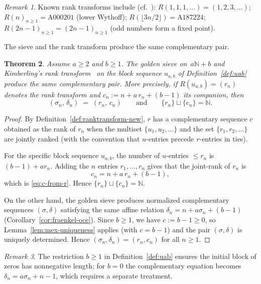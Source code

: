 \documentclass[11pt]{article}
\numberwithin{equation}{section}
\theoremstyle{plain}
\newtheorem{theorem}{Theorem}[section]
\theoremstyle{definition}
\theoremstyle{remark}
\newtheorem{remark}[theorem]{Remark}
\newcommand{\N}{\mathbb{N}}
\begin{document}
\begin{remark}
Known rank transforms include (cf.~\cite{Kimberling2007}):
$R(1,1,1,\ldots)=(1,2,3,\ldots)$;
$R(n)_{n\ge1}=\text{A000201}$ (lower Wythoff);
$R(\lfloor 3n/2\rfloor)=\text{A187224}$;
$R(2n-1)_{n\ge1}=(2n-1)_{n\ge1}$ (odd numbers form a fixed point).
\end{remark}

The sieve and the rank transform produce the same complementary pair.

\begin{theorem}\label{thm:ranktransform-new}
Assume $a\ge2$ and $b\ge1$.  The golden sieve on~$a\N+b$ and
Kimberling's rank transform~\cite{Kimberling2011} on the block
sequence $u_{a,b}$ of Definition~\textup{\ref{def:uab}} produce the
same complementary pair.  More precisely, if $R(u_{a,b})=(r_n)$ denotes
the rank transform and $c_n := n + a\,r_n + (b-1)$ its companion, then
\begin{equation}\label{eq:c-from-r}
  (\sigma_n,\,\delta_n) \;=\; (r_n,\,c_n)
  \qquad\text{and}\qquad
  \{r_n\}\sqcup\{c_n\}=\N.
\end{equation}
\end{theorem}

\begin{proof}
By Definition~\ref{def:ranktransform-new}, $r$ has a complementary sequence $c$ obtained as
the rank of $r_n$ when the multiset $\{u_1,u_2,\ldots\}$ and the set
$\{r_1,r_2,\ldots\}$ are jointly ranked (with the convention that $u$-entries
precede $r$-entries in ties).

For the specific block sequence $u_{a,b}$, the
number of $u$-entries $\le r_n$ is $(b-1)+a r_n$. Adding the $n$ entries
$r_1,\ldots,r_n$ gives that the joint-rank of $r_n$ is
\[
  c_n = n+a\,r_n+(b-1),
\]
which is \eqref{eq:c-from-r}. Hence $\{r_n\}\sqcup\{c_n\}=\N$.

On the other hand, the golden sieve produces normalized complementary sequences
$(\sigma,\delta)$ satisfying the same affine relation
$\delta_n=n+a\sigma_n+(b-1)$ (Corollary~\ref{cor:fraenkel-oce}).  Since $b\ge1$,
we have $c:=b-1\ge0$, so Lemma~\ref{lem:mex-uniqueness} applies (with $c=b-1$)
and the pair $(\sigma,\delta)$ is uniquely determined.  Hence
$(\sigma_n,\delta_n)=(r_n,c_n)$ for all $n\ge1$.
\end{proof}

\begin{remark}
The restriction $b\ge1$ in Definition~\ref{def:uab} ensures the initial block of
zeros has nonnegative length; for $b=0$ the complementary equation becomes
$\delta_n=a\sigma_n+n-1$, which requires a separate treatment.
\end{remark}
\end{document}

